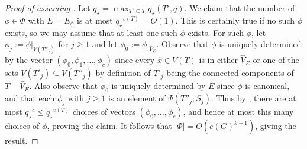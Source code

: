 \documentclass[10pt,a4paper]{amsart}
\newcommand{\Pow}{{q_\star}} %
\newcommand{\sub}{\subseteq}
\begin{document}
\begin{proof}[Proof of  assuming ]
		Let $\displaystyle\Pow=\max_{T'\sub T} \Pow(T',q)$.  We claim that the number of $\phi\in \Phi$ with $E=E_\phi$ is at most $\Pow^{v(T)}=O(1)$.  This is certainly true if no such $\phi$ exists, so we may assume that at least one such $\phi$ exists.  For such $\phi$, let $\phi_j:=\phi|_{V(T''_j)}$ for $j\ge 1$ and let $\phi_0:=\phi|_{\widehat{V}_E}$.  Observe that $\phi$ is uniquely determined by the vector $(\phi_0,\phi_1,\ldots,\phi_c)$ since every $\hat{x}\in V(T)$ is in either $\widehat{V}_E$ or one of the sets $V(T'_j)\subseteq V(T''_j)$ by definition of $T'_j$ being the connected components of $T-\widehat{V}_E$.  Also observe that $\phi_0$ is uniquely determined by $E$ since $\phi$ is canonical, and that each $\phi_j$ with $j\ge 1$ is an element of $\Psi(T''_j;S_j)$.  Thus by , there are at most $\Pow^{c}\le \Pow^{v(T)}$ choices of vectors $(\phi_0,\ldots,\phi_c)$, and hence at most this many choices of $\phi$, proving the claim.  It follows that $|\Phi|=O(e(G)^{k-1})$, giving the result.
	\end{proof}
\end{document}
